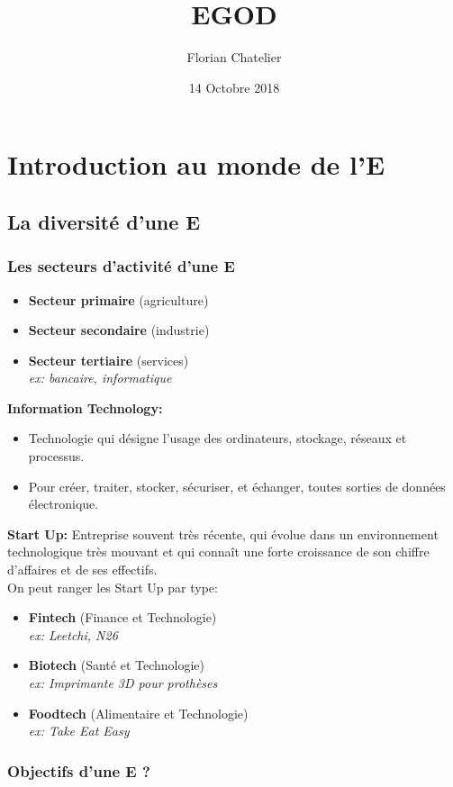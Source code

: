 \documentclass[a4paper,11pt]{report}
\title{EGOD}
\author{Florian Chatelier}
\date{14 Octobre 2018}
\begin{document}
\tableofcontents
\part{Introduction au monde de l'E}
\chapter{La diversité d'une E}
\section{Les secteurs d'activité d'une E}
\begin{itemize}
    \item \textbf{Secteur primaire} (agriculture)
    \item \textbf{Secteur secondaire} (industrie)
    \item \textbf{Secteur tertiaire} (services)\\ 
    \textit{ ex: bancaire, informatique} 
\end{itemize}
\textbf{Information Technology:}
\begin{itemize}
    \item Technologie qui désigne l'usage des ordinateurs, stockage, réseaux et processus.
    \item Pour créer, traiter, stocker, sécuriser, et échanger, toutes sorties de données électronique.\\
\end{itemize}
\textbf{Start Up:}
Entreprise souvent très récente, qui évolue dans un environnement technologique très mouvant et qui connaît une forte croissance de son chiffre d'affaires et de ses effectifs.
\\
On peut ranger les Start Up par type:
\begin{itemize}
    \item \textbf{Fintech} (Finance et Technologie) \\
    \textit{ex: Leetchi, N26}
    \item \textbf{Biotech} (Santé et Technologie) \\
    \textit{ex: Imprimante 3D pour prothèses}
    \item \textbf{Foodtech} (Alimentaire et Technologie) \\
    \textit{ex: Take Eat Easy}
\end{itemize}
\newpage
\section{Objectifs d'une E ?}
\end{document}
